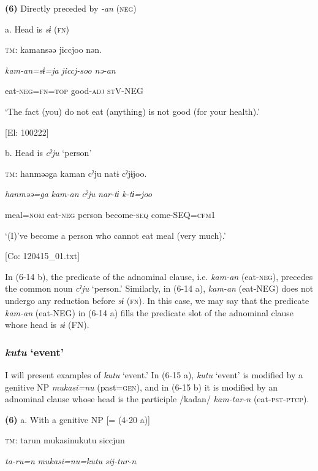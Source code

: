 \textbf{(6)}  Directly preceded by \textit{{}-an} (\textsc{neg})

  a.  Head is \textit{sɨ} (\textsc{fn})

    \textsc{tm}:  kamansəə  jiccjoo  nən.

      \textit{kam-an=sɨ=ja}  \textit{jiccj-soo}  \textit{nə-an}

      eat-\textsc{neg}=\textsc{fn}=\textsc{top}  good-\textsc{adj}  \textsc{st}V-NEG

      ‘The fact (you) do not eat (anything) is not good (for your health).’

      [El: 100222]

  b.  Head is \textit{cˀju} ‘person’

    \textsc{tm}:  hanməəga  kaman  cˀju  natɨ  cˀjɨjoo.

      \textit{hanməə=ga}  \textit{kam-an}  \textit{cˀju}  \textit{nar-tɨ}  \textit{k-tɨ=joo}

      meal=\textsc{nom}  eat-\textsc{neg}  person  become-\textsc{seq}  come-SEQ=\textsc{cfm}1

      ‘(I)’ve become a person who cannot eat meal (very much).’

      [Co: 120415\_01.txt]

In (6-14 b), the predicate of the adnominal clause, i.e. \textit{kam-an} (eat-\textsc{neg}), precedes the common noun \textit{cˀju} ‘person.’ Similarly, in (6-14 a), \textit{kam-an} (eat-NEG) does not undergo any reduction before \textit{sɨ} (\textsc{fn}). In this case, we may say that the predicate \textit{kam-an} (eat-NEG) in (6-14 a) fills the predicate slot of the adnominal clause whose head is \textit{sɨ} (FN).

\subsubsection{\textit{kutu} ‘event’}

I will present examples of \textit{kutu} ‘event.’ In (6-15 a), \textit{kutu} ‘event’ is modified by a genitive NP \textit{mukasi=nu} (past=\textsc{gen}), and in (6-15 b) it is modified by an adnominal clause whose head is the participle /kadan/ \textit{kam-tar-n} (eat-\textsc{pst}-\textsc{ptcp}).

\textbf{(6)}  a.  With a genitive NP [= (4-20 a)]

    \textsc{tm}:  tarun  mukasinukutu  siccjun

      \textit{ta-ru=n}  \textit{mukasi=nu=kutu}  \textit{sij-tur-n}

